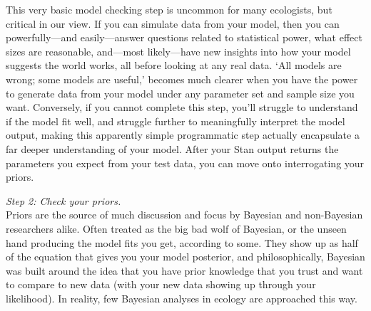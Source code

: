 \documentclass[11pt]{article}
\begin{document}
{This very basic model checking step is uncommon for many ecologists, but critical in our view. If you can simulate data from your model, then you can powerfully---and easily---answer questions related to statistical power, what effect sizes are reasonable, and---most likely---have new insights into how your model suggests the world works, all before looking at any real data. `All models are wrong; some models are useful,' becomes much clearer when you have the power to generate data from your model under any parameter set and sample size you want. Conversely, if you cannot complete this step, you'll struggle to understand if the model fit well, and struggle further to meaningfully interpret the model output, making this apparently simple programmatic step actually encapsulate a far deeper understanding of your model. After your \textsf{Stan} output returns the parameters you expect from your test data, you can move onto interrogating your priors. 

\emph{Step 2: Check your priors.} \\
Priors are the source of much discussion and focus by Bayesian and non-Bayesian researchers alike. Often treated as the big bad wolf of Bayesian, or the unseen hand producing the model fits you get, according to some. They show up as half of the equation that gives you your model posterior, and philosophically, Bayesian was built around the idea that you have prior knowledge that you trust and want to compare to new data (with your new data showing up through your likelihood). In reality, few Bayesian analyses in ecology are approached this way. 

}
\end{document}
